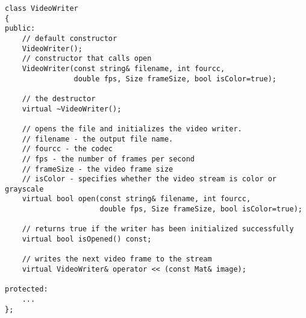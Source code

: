 \begin{lstlisting}
class VideoWriter
{
public:    
    // default constructor
    VideoWriter();
    // constructor that calls open
    VideoWriter(const string& filename, int fourcc,
                double fps, Size frameSize, bool isColor=true);
    
    // the destructor
    virtual ~VideoWriter();
    
    // opens the file and initializes the video writer.
    // filename - the output file name. 
    // fourcc - the codec
    // fps - the number of frames per second
    // frameSize - the video frame size
    // isColor - specifies whether the video stream is color or grayscale
    virtual bool open(const string& filename, int fourcc,
                      double fps, Size frameSize, bool isColor=true);
    
    // returns true if the writer has been initialized successfully
    virtual bool isOpened() const;
    
    // writes the next video frame to the stream
    virtual VideoWriter& operator << (const Mat& image);
    
protected:
    ...
};
\end{lstlisting}

\fi

